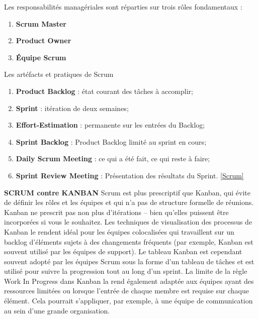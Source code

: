 Les responsabilités managériales sont réparties sur trois rôles fondamentaux :
\begin{enumerate}
	\item \textbf{Scrum Master}
	\item \textbf{Product Owner}
	\item \textbf{Équipe Scrum}
	\newline
\end{enumerate}
Les artéfacts et pratiques de Scrum
\begin{enumerate}
	\item \textbf{Product Backlog} : état courant des tâches à accomplir;
	\item \textbf{Sprint} : itération de deux semaines;
	\item \textbf{Effort-Estimation} : permanente sur les entrées du Backlog;
	\item \textbf{Sprint Backlog} : Product Backlog limité au sprint en cours;
	\item \textbf{Daily Scrum Meeting} : ce qui a été fait, ce qui reste à faire;
	\item \textbf{Sprint Review Meeting} : Présentation des résultats du Sprint. \ref{Scrum}
	\newline \newline \newline
\end{enumerate}
\textbf{SCRUM contre KANBAN}
\newline
Scrum est plus prescriptif que Kanban, qui évite de définir les rôles et les équipes et qui n’a pas de structure formelle de réunions. Kanban ne prescrit pas non plus d’itérations – bien qu’elles puissent être incorporées si vous le souhaitez. \newline
Les techniques de visualisation des processus de Kanban le rendent idéal pour les équipes colocalisées qui travaillent sur un backlog d’éléments sujets à des changements fréquents (par exemple, Kanban est souvent utilisé par les équipes de support). \newline
Le tableau Kanban est cependant souvent adopté par les équipes Scrum sous la forme d’un tableau de tâches et est utilisé pour suivre la progression tout au long d’un sprint. \newline
La limite de la règle Work In Progress dans Kanban la rend également adaptée aux équipes ayant des ressources limitées ou lorsque l’entrée de chaque membre est requise sur chaque élément. Cela pourrait s’appliquer, par exemple, à une équipe de communication au sein d’une grande organisation. \newline
